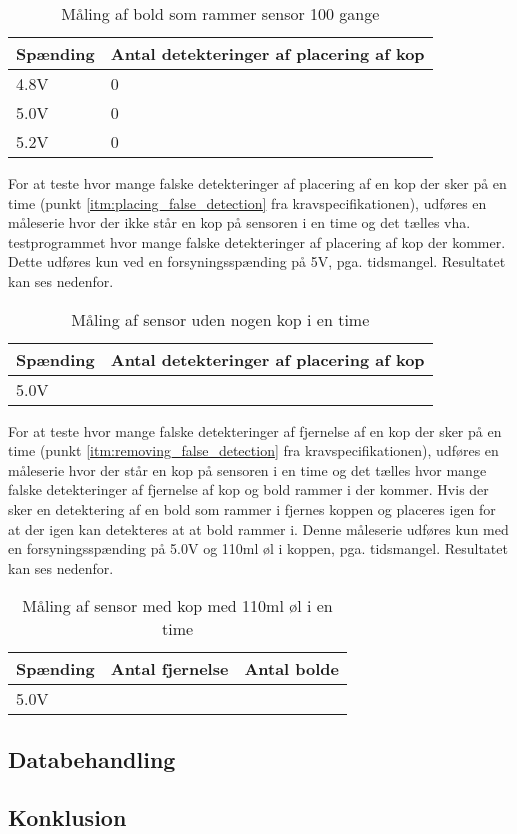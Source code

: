 \documentclass[Modultest/Modultest_main.tex]{subfiles}
\begin{document}
\begin{table}[H]
    \centering
    \begin{tabular}{|L{0.15\textwidth}|L{0.2\textwidth}|}
         \hline
         \textbf{Spænding} & \textbf{Antal detekteringer af placering af kop} \\ \hline
         4.8V &  0\\ \hline 
         5.0V &  0\\ \hline 
         5.2V &  0\\ \hline
    \end{tabular}
    \caption{Måling af bold som rammer sensor 100 gange}
     \label{tab:100_hit_sensor}
\end{table}

For at teste hvor mange falske detekteringer af placering af en kop der sker på en time (punkt \ref{itm:placing_false_detection} fra kravspecifikationen), udføres en måleserie hvor der ikke står en kop på sensoren i en time og det tælles vha. testprogrammet hvor mange falske detekteringer af placering af kop der kommer. Dette udføres kun ved en forsyningsspænding på 5V, pga. tidsmangel. Resultatet kan ses nedenfor.

\begin{table}[H]
    \centering
    \begin{tabular}{|L{0.15\textwidth}|L{0.2\textwidth}|}
         \hline
         \textbf{Spænding} & \textbf{Antal detekteringer af placering af kop} \\ \hline
         5.0V &  \\ \hline
    \end{tabular}
    \caption{Måling af sensor uden nogen kop i en time}
     \label{tab:1_hour_no_cup}
\end{table}

For at teste hvor mange falske detekteringer af fjernelse af en kop der sker på en time (punkt \ref{itm:removing_false_detection} fra kravspecifikationen), udføres en måleserie hvor der står en kop på sensoren i en time og det tælles hvor mange falske detekteringer af fjernelse af kop og bold rammer i der kommer. Hvis der sker en detektering af en bold som rammer i fjernes koppen og placeres igen for at der igen kan detekteres at at bold rammer i. Denne måleserie udføres kun med en forsyningsspænding på 5.0V og 110ml øl i koppen, pga. tidsmangel. Resultatet kan ses nedenfor.

\begin{table}[H]
    \centering
    \begin{tabular}{|L{0.15\textwidth}|L{0.2\textwidth}|L{0.2\textwidth}|}
         \hline
         \textbf{Spænding} & \textbf{Antal fjernelse} & \textbf{Antal bolde} \\ \hline
         5.0V & & \\ \hline
    \end{tabular}
    \caption{Måling af sensor med kop med 110ml øl i en time}
     \label{tab:1_hour_with_cup}
\end{table}

\subsection{Databehandling}

\subsection{Konklusion}
\end{document}
